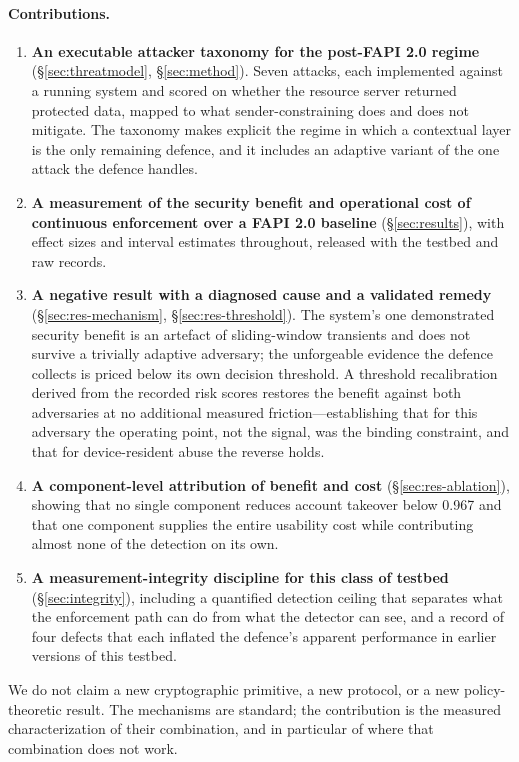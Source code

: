 \paragraph{Contributions.}
\begin{enumerate}
  \item \textbf{An executable attacker taxonomy for the post-FAPI 2.0 regime} (\S\ref{sec:threatmodel}, \S\ref{sec:method}). Seven attacks, each implemented against a running system and scored on whether the resource server returned protected data, mapped to what sender-constraining does and does not mitigate. The taxonomy makes explicit the regime in which a contextual layer is the only remaining defence, and it includes an adaptive variant of the one attack the defence handles.
  \item \textbf{A measurement of the security benefit and operational cost of continuous enforcement over a FAPI 2.0 baseline} (\S\ref{sec:results}), with effect sizes and interval estimates throughout, released with the testbed and raw records.
  \item \textbf{A negative result with a diagnosed cause and a validated remedy} (\S\ref{sec:res-mechanism}, \S\ref{sec:res-threshold}). The system's one demonstrated security benefit is an artefact of sliding-window transients and does not survive a trivially adaptive adversary; the unforgeable evidence the defence collects is priced below its own decision threshold. A threshold recalibration derived from the recorded risk scores restores the benefit against both adversaries at no additional measured friction---establishing that for this adversary the operating point, not the signal, was the binding constraint, and that for device-resident abuse the reverse holds.
  \item \textbf{A component-level attribution of benefit and cost} (\S\ref{sec:res-ablation}), showing that no single component reduces account takeover below 0.967 and that one component supplies the entire usability cost while contributing almost none of the detection on its own.
  \item \textbf{A measurement-integrity discipline for this class of testbed} (\S\ref{sec:integrity}), including a quantified detection ceiling that separates what the enforcement path can do from what the detector can see, and a record of four defects that each inflated the defence's apparent performance in earlier versions of this testbed.
\end{enumerate}

We do not claim a new cryptographic primitive, a new protocol, or a new policy-theoretic result. The mechanisms are standard; the contribution is the measured characterization of their combination, and in particular of where that combination does not work.

